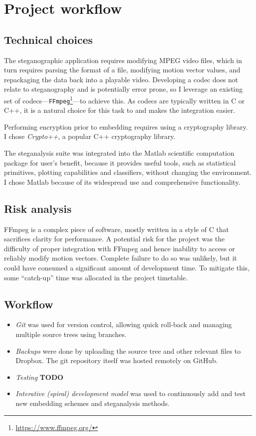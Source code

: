 \documentclass[12pt,british,twoside,notitlepage,usenames,dvipsnames,hypens,final]{report}
\numberwithin{equation}{section}
\numberwithin{figure}{section}
\begin{document}
\section{Project workflow}

\subsection{Technical choices}

The steganographic application requires modifying MPEG video files, which in turn requires parsing the format of a file, modifying motion vector values, and repackaging the data back into a playable video. Developing a codec does not relate to steganography and is potentially error prone, so I leverage an existing set of codecs---\texttt{FFmpeg}\footnote{\url{https://www.ffmpeg.org/}}---to achieve this. As codecs are typically written in C or C++, it is a natural choice for this task to and makes the integration easier.

Performing encryption prior to embedding requires using a cryptography library. I chose \emph{Crypto++}, a popular C++ cryptography library.

The steganalysis suite was integrated into the Matlab scientific computation package for user's benefit, because it provides useful tools, such as statistical primitives, plotting capabilities and classifiers, without changing the environment. I chose Matlab  because of its widespread use and comprehensive functionality.

\subsection{Risk analysis}
FFmpeg is a complex piece of software, mostly written in a style of C that sacrifices clarity for performance. A potential risk for the project was the difficulty of proper integration with FFmpeg and hence inability to access or reliably modify motion vectors. Complete failure to do so was unlikely, but it could have consumed a significant amount of development time. To mitigate this, some ``catch-up'' time was allocated in the project timetable.  

\subsection{Workflow}
\begin{itemize}
\item \emph{Git} was used for version control, allowing quick roll-back and managing multiple source trees using branches.
\item \emph{Backups} were done by uploading the source tree and other relevant files to Dropbox. The git repository itself was hosted remotely on GitHub.
\item \emph{Testing} \textbf{TODO}
\item \emph{Interative (spiral) development model} was used to continuously add and test new embedding schemes and steganalysis methods.
\end{itemize}
\end{document}

